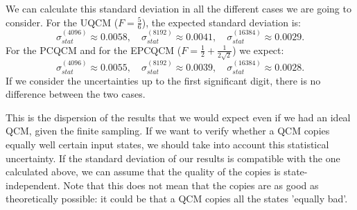 We can calculate this standard deviation in all the different cases we are going to consider.
For the UQCM ($F=\frac{5}{6}$), the expected standard deviation is:
\begin{equation}
    \sigma_{stat}^{(4096)}\approx 0.0058, \quad \sigma_{stat}^{(8192)}\approx 0.0041, \quad \sigma_{stat}^{(16384)}\approx 0.0029.
    \label{eqn:dispersion_uqcm}
\end{equation}
For the PCQCM and for the EPCQCM ($F=\frac{1}{2}+\frac{1}{2\sqrt{2}}$) we expect:
\begin{equation}
    \sigma_{stat}^{(4096)}\approx 0.0055, \quad \sigma_{stat}^{(8192)}\approx 0.0039, \quad \sigma_{stat}^{(16384)}\approx 0.0028.
    \label{eqn:dispersion_pcqcm}
\end{equation}
If we consider the uncertainties up to the first significant digit, there is no difference between the two cases.

This is the dispersion of the results that we would expect even if we had an ideal QCM, given the finite sampling.
If we want to verify whether a QCM copies equally well certain input states, we should take into account this statistical uncertainty.
If the standard deviation of our results is compatible with the one calculated above, we can assume that the quality of the copies is state-independent.
Note that this does not mean that the copies are as good as theoretically possible: it could be that a QCM copies all the states 'equally bad'.  